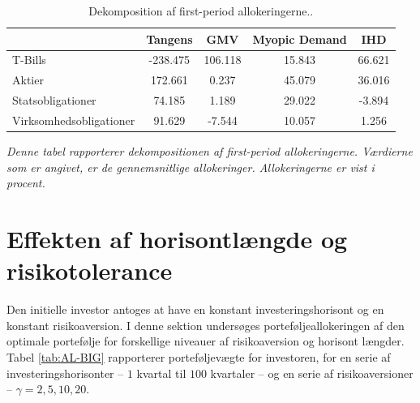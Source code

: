 \documentclass[
  a4paper,
  oneside]{memoir}
\begin{document}
\begin{table}[H]

\caption{\label{tab:AL-KOMP}Dekomposition af first-period allokeringerne..}
\centering
\begin{threeparttable}
\begin{tabular}[t]{lcccc}
\toprule
  & Tangens & GMV & Myopic Demand & IHD\\
\midrule
\rowcolor{gray!6}  T-Bills & -238.475 & 106.118 & 15.843 & 66.621\\
Aktier & 172.661 & 0.237 & 45.079 & 36.016\\
\rowcolor{gray!6}  Statsobligationer & 74.185 & 1.189 & 29.022 & -3.894\\
Virksomhedsobligationer & 91.629 & -7.544 & 10.057 & 1.256\\
\bottomrule
\end{tabular}
\begin{tablenotes}
\item \textit{Denne tabel rapporterer dekompositionen af first-period allokeringerne. Værdierne som er angivet, er de gennemsnitlige allokeringer. Allokeringerne er vist i procent.}
\end{tablenotes}
\end{threeparttable}
\end{table}

\hypertarget{effekten-af-horisontluxe6ngde-og-risikotolerance}{%
\section{Effekten af horisontlængde og risikotolerance}\label{effekten-af-horisontluxe6ngde-og-risikotolerance}}

Den initielle investor antoges at have en konstant investeringshorisont og en konstant risikoaversion. I denne sektion undersøges porteføljeallokeringen af den optimale portefølje for forskellige niveauer af risikoaversion og horisont længder. Tabel \ref{tab:AL-BIG} rapporterer porteføljevægte for investoren, for en serie af investeringshorisonter -- \(1\) kvartal til \(100\) kvartaler -- og en serie af risikoaversioner -- \(\gamma=2,5,10,20\).
\end{document}
